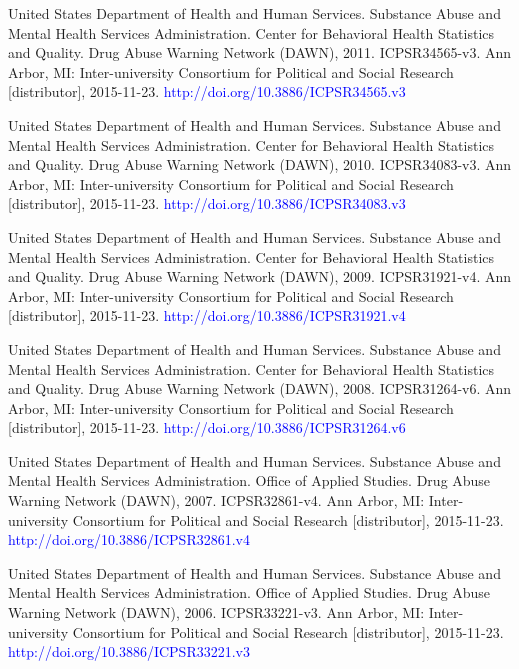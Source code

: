 \documentclass[a4 paper]{article}
\begin{document}
\begin{thebibliography}{1}
	 United States Department of Health and Human Services. Substance Abuse and Mental Health Services Administration. Center for Behavioral Health Statistics and Quality. Drug Abuse Warning Network (DAWN), 2011. ICPSR34565-v3. Ann Arbor, MI: Inter-university Consortium for Political and Social Research [distributor], 2015-11-23. \textcolor{blue}{http://doi.org/10.3886/ICPSR34565.v3}
	
	 United States Department of Health and Human Services. Substance Abuse and Mental Health Services Administration. Center for Behavioral Health Statistics and Quality. Drug Abuse Warning Network (DAWN), 2010. ICPSR34083-v3. Ann Arbor, MI: Inter-university Consortium for Political and Social Research [distributor], 2015-11-23. \textcolor{blue}{http://doi.org/10.3886/ICPSR34083.v3}
	
	 United States Department of Health and Human Services. Substance Abuse and Mental Health Services Administration. Center for Behavioral Health Statistics and Quality. Drug Abuse Warning Network (DAWN), 2009. ICPSR31921-v4. Ann Arbor, MI: Inter-university Consortium for Political and Social Research [distributor], 2015-11-23. \textcolor{blue}{http://doi.org/10.3886/ICPSR31921.v4}
	
	 United States Department of Health and Human Services. Substance Abuse and Mental Health Services Administration. Center for Behavioral Health Statistics and Quality. Drug Abuse Warning Network (DAWN), 2008. ICPSR31264-v6. Ann Arbor, MI: Inter-university Consortium for Political and Social Research [distributor], 2015-11-23. \textcolor{blue}{http://doi.org/10.3886/ICPSR31264.v6}
	
	 United States Department of Health and Human Services. Substance Abuse and Mental Health Services Administration. Office of Applied Studies. Drug Abuse Warning Network (DAWN), 2007. ICPSR32861-v4. Ann Arbor, MI: Inter-university Consortium for Political and Social Research [distributor], 2015-11-23. \textcolor{blue}{http://doi.org/10.3886/ICPSR32861.v4}
	
	 United States Department of Health and Human Services. Substance Abuse and Mental Health Services Administration. Office of Applied Studies. Drug Abuse Warning Network (DAWN), 2006. ICPSR33221-v3. Ann Arbor, MI: Inter-university Consortium for Political and Social Research [distributor], 2015-11-23. \textcolor{blue}{http://doi.org/10.3886/ICPSR33221.v3}
	

\end{thebibliography}
\end{document}
